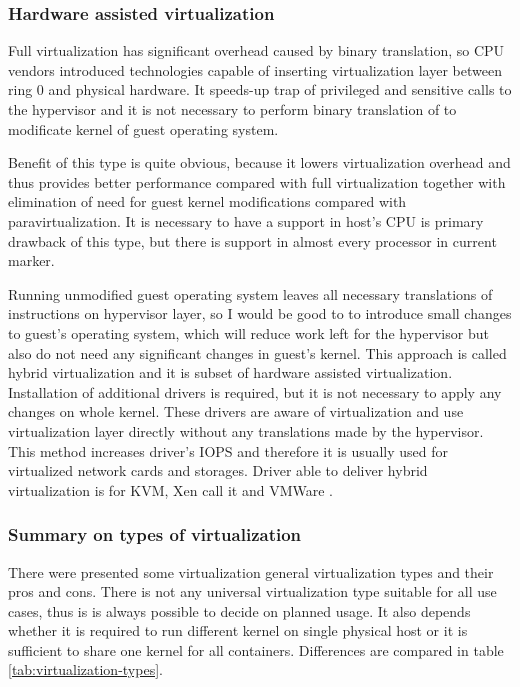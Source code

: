 \subsubsection{Hardware assisted virtualization}
Full virtualization has significant overhead caused by binary translation, so \Ac{CPU} vendors introduced technologies capable of inserting virtualization layer between ring 0 and physical hardware. It speeds-up trap of privileged and sensitive calls to the hypervisor and it is not necessary to perform binary translation of to modificate kernel of guest operating system. 

Benefit of this type is quite obvious, because it lowers virtualization overhead and thus provides better performance compared with full virtualization together with elimination of need for guest kernel modifications compared with paravirtualization. It is necessary to have a support in host's \Ac{CPU} is primary drawback of this type, but there is support in almost every processor in current marker.

Running unmodified guest operating system leaves all necessary translations of instructions on hypervisor layer, so I would be good to to introduce small changes to guest's operating system, which will reduce work left for the hypervisor but also do not need any significant changes in guest's kernel. This approach is called hybrid virtualization and it is subset of hardware assisted virtualization. Installation of additional drivers is required, but it is not necessary to apply any changes on whole kernel. These drivers are aware of virtualization and use virtualization layer directly without any translations made by the hypervisor. This method increases driver's \Ac{IOPS} and therefore it is usually used for virtualized network cards and storages. Driver able to deliver hybrid virtualization is  for \Ac{KVM}, Xen call it  and VMWare  .

\subsubsection{Summary on types of virtualization}
There were presented some virtualization general virtualization types and their pros and cons. There is not any universal virtualization type suitable for all use cases, thus is is always possible to decide on planned usage. It also depends whether it is required to run different kernel on single physical host or it is sufficient to share one kernel for all containers. Differences are compared in table \ref{tab:virtualization-types}.

